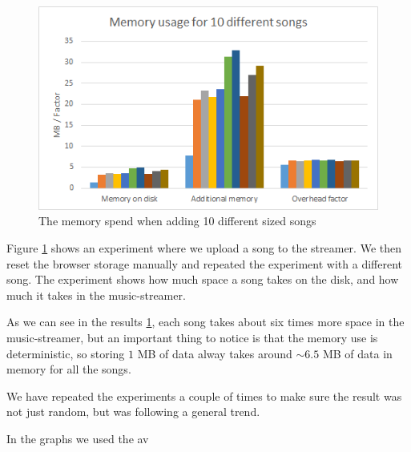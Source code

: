 \begin{figure}[H]
	\centering
	\includegraphics[scale=0.9]{gfx/memoryDiffSize}
	\caption{The memory spend when adding 10 different sized songs}
	\label{fig:memoryDiffSizes}
\end{figure}
\noindent
Figure \ref{fig:memoryDiffSizes} shows an experiment where we upload a song to the streamer. 
We then reset the browser storage manually and repeated the experiment with a different song.
The experiment shows how much space a song takes on the disk,
and how much it takes in the music-streamer.

As we can see in the results \ref{fig:memoryDiffSizes},
each song takes about six times more space in the music-streamer, 
but an important thing to notice is that the memory use is deterministic,
so storing $1$ MB of data alway takes around $\sim6.5$ MB of data in memory for all the songs.

We have repeated the experiments a couple of times to make sure the result was not just random, 
but was following a general trend. 

In the graphs we used the av
